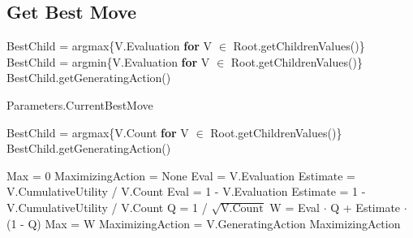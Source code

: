 \newpage
\subsection*{Get Best Move}
\begin{algorithm}[H]
    \begin{algorithmic}[1]
                \State BestChild = argmax\{V.Evaluation \textbf{for} V $\in$ Root.getChildrenValues()\}
            \Else
                \State BestChild = argmin\{V.Evaluation \textbf{for} V $\in$ Root.getChildrenValues()\}
            \EndIf
            \State \Return BestChild.getGeneratingAction()
        \EndProcedure
    \end{algorithmic}    
\end{algorithm}

\begin{algorithm}[H]
    \begin{algorithmic}[1]
            \State \Return Parameters.CurrentBestMove 
        \EndProcedure
    \end{algorithmic}    
\end{algorithm}

\begin{algorithm}[H]
    \begin{algorithmic}[1]
            \State BestChild = argmax\{V.Count \textbf{for} V $\in$ Root.getChildrenValues()\}
            \State \Return BestChild.getGeneratingAction() 
        \EndProcedure
    \end{algorithmic}    
\end{algorithm}

\begin{algorithm}[H]
    \begin{algorithmic}[1]
            \State Max = 0
            \State MaximizingAction = None
                    \State Eval = V.Evaluation
                    \State Estimate = V.CumulativeUtility / V.Count
                \Else 
                    \State Eval = 1 - V.Evaluation
                    \State Estimate = 1 - V.CumulativeUtility / V.Count
                \EndIf
                \State Q = 1 / $\sqrt{\text{V.Count}}$
                \State W = Eval $\cdot$ Q + Estimate $\cdot$ (1 - Q)
                    \State Max = W
                    \State MaximizingAction = V.GeneratingAction
                \EndIf
            \EndFor 
            \State \Return MaximizingAction
        \EndProcedure
    \end{algorithmic}    
\end{algorithm}

